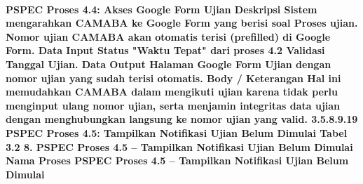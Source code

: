 \paragraph{PSPEC Proses 4.4: Akses Google Form Ujian Deskripsi Sistem mengarahkan CAMABA ke Google Form yang berisi soal Proses ujian. Nomor ujian CAMABA akan otomatis terisi (prefilled) di Google Form. Data Input Status "Waktu Tepat" dari proses 4.2 Validasi Tanggal Ujian. Data Output Halaman Google Form Ujian dengan nomor ujian yang sudah terisi otomatis. Body / Keterangan Hal ini memudahkan CAMABA dalam mengikuti ujian karena tidak perlu menginput ulang nomor ujian, serta menjamin integritas data ujian dengan menghubungkan langsung ke nomor ujian yang valid. 3.5.8.9.19 PSPEC Proses 4.5: Tampilkan Notifikasi Ujian Belum Dimulai Tabel 3.2 8. PSPEC Proses 4.5 – Tampilkan Notifikasi Ujian Belum Dimulai Nama Proses PSPEC Proses 4.5 – Tampilkan Notifikasi Ujian Belum Dimulai}~\\
